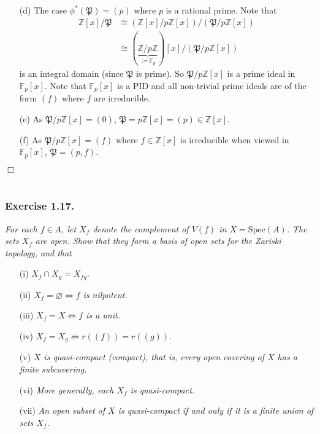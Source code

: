 \documentclass{article}
\begin{document}
\begin{enumerate}
\begin{enumerate}
  \item[(d)]
    The case $\phi^{*}(\mathfrak{P}) = (p)$ where $p$ is a rational prime.
    Note that
    \begin{align*}
      \mathbb{Z}[x]/\mathfrak{P}
      &\cong (\mathbb{Z}[x]/p\mathbb{Z}[x])/(\mathfrak{P}/p\mathbb{Z}[x]) \\
      &\cong (\underbrace{\mathbb{Z}/p\mathbb{Z}}_{:= \mathbb{F}_p})[x]/(\mathfrak{P}/p\mathbb{Z}[x])
    \end{align*}
    is an integral domain (since $\mathfrak{P}$ is prime).
    So $\mathfrak{P}/p\mathbb{Z}[x]$ is a prime ideal in $\mathbb{F}_p[x]$.
    Note that $\mathbb{F}_p[x]$ is a PID and
    all non-trivial prime ideals are of the form $(f)$ where $f$ are irreducible.

  \item[(e)]
    As $\mathfrak{P}/p\mathbb{Z}[x] = (0)$, $\mathfrak{P} = p\mathbb{Z}[x] = (p) \in \mathbb{Z}[x]$.

  \item[(f)]
    As $\mathfrak{P}/p\mathbb{Z}[x] = (f)$
    where $f \in \mathbb{Z}[x]$ is irreducible when viewed in $\mathbb{F}_p[x]$,
    $\mathfrak{P} = (p,f)$.
  \end{enumerate}
\end{enumerate}
$\Box$ \\\\






\subsubsection*{Exercise 1.17.}
\emph{For each $f \in A$,
let $X_f$ denote the complement of $V(f)$ in $X = \mathrm{Spec}(A)$.
The sets $X_f$ are open.
Show that they form a basis of open sets for the Zariski topology, and that}
\begin{enumerate}
\item[(i)]
\emph{$X_f \cap X_g = X_{fg}$.}
\item[(ii)]
\emph{$X_f = \varnothing \Longleftrightarrow f$ is nilpotent.}
\item[(iii)]
\emph{$X_f = X \Longleftrightarrow f$ is a unit.}
\item[(iv)]
\emph{$X_f = X_g \Longleftrightarrow r((f)) = r((g))$.}
\item[(v)]
\emph{$X$ is quasi-compact (compact), that is,
every open covering of $X$ has a finite subcovering.}
\item[(vi)]
\emph{More generally, each $X_f$ is quasi-compact.}
\item[(vii)]
\emph{An open subset of $X$ is quasi-compact if and only if
it is a finite union of sets $X_f$.}
\end{enumerate}
\end{document}
